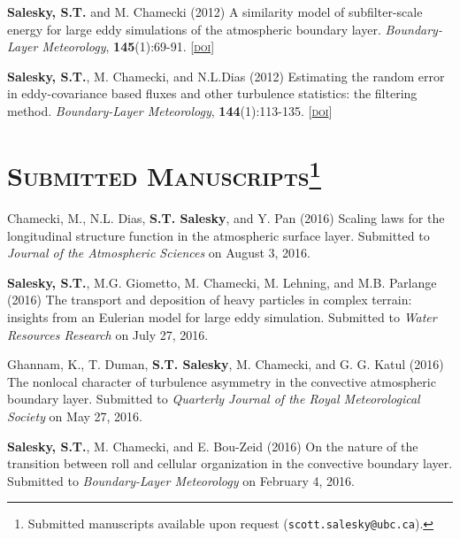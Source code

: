 \documentclass[11pt,letterpaper]{article}
\begin{document}
\textbf{Salesky, S.T.} and M. Chamecki  (2012) A similarity model of subfilter-scale energy for large eddy simulations of the atmospheric boundary layer. \textit{Boundary-Layer Meteorology}, \textbf{145}(1):69-91. [\href{http://doi.org/10.1007/s10546-011-9618-0}{\textsc{doi}}]

\textbf{Salesky, S.T.}, M. Chamecki, and N.L.Dias (2012) Estimating the random error in eddy-covariance based fluxes and other turbulence statistics: the filtering method. \textit{Boundary-Layer Meteorology}, \textbf{144}(1):113-135. [\href{http://doi.org/10.1007/s10546-012-9710-0}{\textsc{doi}}]



\section*{\textsc{Submitted Manuscripts}\footnote[2]{Submitted manuscripts available upon request (\texttt{scott.salesky@ubc.ca}).}}

Chamecki, M., N.L. Dias, \textbf{S.T. Salesky}, and Y. Pan (2016) Scaling laws
for the longitudinal structure function in the atmospheric surface layer.
Submitted to \textit{Journal of the Atmospheric Sciences} on August 3, 2016.

\textbf{Salesky, S.T.}, M.G. Giometto, M. Chamecki, M. Lehning, and M.B.
Parlange (2016) The transport and deposition of heavy particles in complex
terrain: insights from an Eulerian model for large eddy simulation. Submitted
to \textit{Water Resources Research} on July 27, 2016.

Ghannam, K., T. Duman, \textbf{S.T. Salesky}, M. Chamecki, and G. G. Katul
(2016) The nonlocal character of turbulence asymmetry in the convective
atmospheric boundary layer. Submitted to \textit{Quarterly Journal of the Royal
  Meteorological Society} on May 27, 2016.

\textbf{Salesky, S.T.}, M. Chamecki, and E. Bou-Zeid (2016) On the nature of
the transition between roll and cellular organization in the convective
boundary layer. Submitted to \textit{Boundary-Layer Meteorology} on February 4, 2016.
\end{document}
